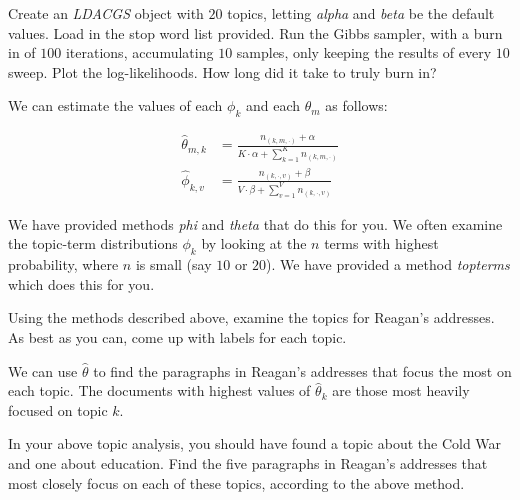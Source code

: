 \begin{problem}
Create an \emph{LDACGS} object with $20$ topics, letting \emph{alpha} and \emph{beta} be the default values. Load in the stop word list provided. Run the Gibbs sampler, with a burn in of $100$ iterations, accumulating $10$ samples, only keeping the results of every $10$ sweep. Plot the log-likelihoods. How long did it take to truly burn in?
\end{problem}

We can estimate the values of each $\phi_{k}$ and each $\theta_{m}$ as follows:

\begin{align*}
\widehat{\theta}_{m,k} & = \frac{n_{(k,m,\cdot)} + \alpha}{K \cdot \alpha + \sum_{k=1}^{K} n_{(k,m,\cdot)}} \\
\widehat{\phi}_{k,v} & = \frac{n_{(k,\cdot,v)} + \beta}{V \cdot \beta + \sum_{v=1}^{V} n_{(k,\cdot,v)}}
\end{align*}

We have provided methods \emph{phi} and \emph{theta} that do this for you. We often examine the topic-term distributions $\phi_{k}$ by looking at the $n$ terms with highest probability, where $n$ is small (say $10$ or $20$).  We have provided a method \emph{topterms} which does this for you.

\begin{problem}
Using the methods described above, examine the topics for Reagan's addresses. As best as you can, come up with labels for each topic.
\end{problem}

We can use $\widehat{\theta}$ to find the paragraphs in Reagan's addresses that focus the most on each topic. The documents with highest values of $\widehat{\theta}_{k}$ are those most heavily focused on topic $k$.

\begin{problem}
In your above topic analysis, you should have found a topic about the Cold War and one about education. Find the five paragraphs in Reagan's addresses that most closely focus on each of these topics, according to the above method.
\end{problem}